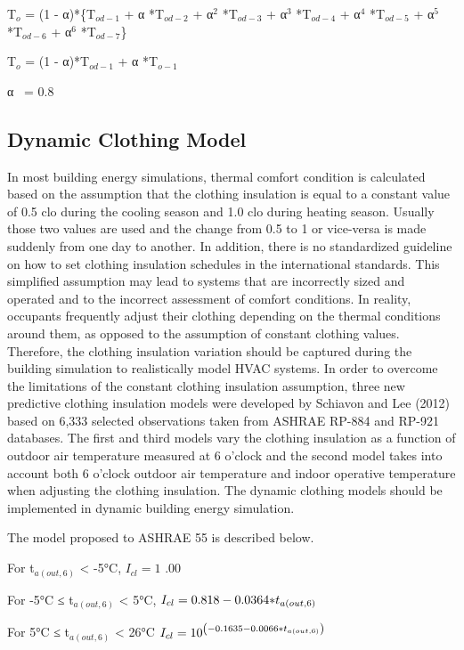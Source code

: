 T\(_{o}\) = (1 - α)*\{T\(_{od-1}\) + α *T\(_{od-2}\) + α\(^{2}\) *T\(_{od-3}\) + α\(^{3}\) *T\(_{od-4}\) + α\(^{4}\) *T\(_{od-5}\) + α\(^{5}\) *T\(_{od-6}\) + α\(^{6}\) *T\(_{od-7}\)\}

T\(_{o}\) = (1 - α)*T\(_{od-1}\) + α *T\(_{o-1}\)

α~ = 0.8

\subsection{Dynamic Clothing Model}\label{dynamic-clothing-model}

In most building energy simulations, thermal comfort condition is calculated based on the assumption that the clothing insulation is equal to a constant value of 0.5 clo during the cooling season and 1.0 clo during heating season. Usually those two values are used and the change from 0.5 to 1 or vice-versa is made suddenly from one day to another. In addition, there is no standardized guideline on how to set clothing insulation schedules in the international standards. This simplified assumption may lead to systems that are incorrectly sized and operated and to the incorrect assessment of comfort conditions. In reality, occupants frequently adjust their clothing depending on the thermal conditions around them, as opposed to the assumption of constant clothing values. Therefore, the clothing insulation variation should be captured during the building simulation to realistically model HVAC systems. In order to overcome the limitations of the constant clothing insulation assumption, three new predictive clothing insulation models were developed by Schiavon and Lee (2012) based on 6,333 selected observations taken from ASHRAE RP-884 and RP-921 databases. The first and third models vary the clothing insulation as a function of outdoor air temperature measured at 6 o'clock and the second model takes into account both 6 o'clock outdoor air temperature and indoor operative temperature when adjusting the clothing insulation. The dynamic clothing models should be implemented in dynamic building energy simulation.

The model proposed to ASHRAE 55 is described below.

For t\(_{a(out,6)}\) \textless{} -5°C, \({I_{cl}} = 1\) .00

For -5°C ≤ t\(_{a(out,6)}\) \textless{} 5°C, \({I_{cl}} = 0.818 - 0.0364{\rm{*}}{t_{a\left( {out,6} \right)}}\)

For 5°C ≤ t\(_{a(out,6)}\) \textless{} 26°C \({I_{cl}} = {10^{\left( { - 0.1635 - 0.0066{\rm{*}}{t_{a\left( {out,6} \right)}}} \right)}}\)

